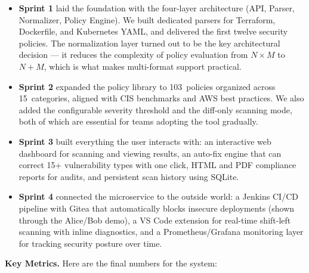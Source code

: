 \begin{itemize}[leftmargin=1.5cm]
  \item \textbf{Sprint 1} laid the foundation with the four-layer architecture (API, Parser, Normalizer, Policy Engine). We built dedicated parsers for Terraform, Dockerfile, and Kubernetes YAML, and delivered the first twelve security policies. The normalization layer turned out to be the key architectural decision --- it reduces the complexity of policy evaluation from $N \times M$ to $N + M$, which is what makes multi-format support practical.
  
  \item \textbf{Sprint 2} expanded the policy library to 103~policies organized across 15~categories, aligned with CIS benchmarks and AWS best practices. We also added the configurable severity threshold and the diff-only scanning mode, both of which are essential for teams adopting the tool gradually.
  
  \item \textbf{Sprint 3} built everything the user interacts with: an interactive web dashboard for scanning and viewing results, an auto-fix engine that can correct 15+ vulnerability types with one click, HTML and PDF compliance reports for audits, and persistent scan history using SQLite.
  
  \item \textbf{Sprint 4} connected the microservice to the outside world: a Jenkins CI/CD pipeline with Gitea that automatically blocks insecure deployments (shown through the Alice/Bob demo), a VS Code extension for real-time shift-left scanning with inline diagnostics, and a Prometheus/Grafana monitoring layer for tracking security posture over time.
\end{itemize}


\vspace{0.3cm}
\noindent\textbf{Key Metrics.}\quad
Here are the final numbers for the system:

